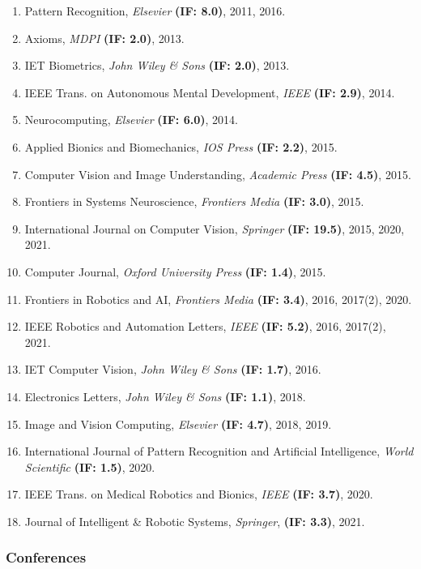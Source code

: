 \documentclass[
]{article}
\begin{document}
\begin{enumerate}
\item
  Pattern Recognition, \emph{Elsevier} \textbf{(IF: 8.0)}, 2011, 2016.
\item
  Axioms, \emph{MDPI} \textbf{(IF: 2.0)}, 2013.
\item
  IET Biometrics, \emph{John Wiley \& Sons} \textbf{(IF: 2.0)}, 2013.
\item
  IEEE Trans. on Autonomous Mental Development, \emph{IEEE} \textbf{(IF:
  2.9)}, 2014.
\item
  Neurocomputing, \emph{Elsevier} \textbf{(IF: 6.0)}, 2014.
\item
  Applied Bionics and Biomechanics, \emph{IOS Press} \textbf{(IF: 2.2)},
  2015.
\item
  Computer Vision and Image Understanding, \emph{Academic Press}
  \textbf{(IF: 4.5)}, 2015.
\item
  Frontiers in Systems Neuroscience, \emph{Frontiers Media} \textbf{(IF:
  3.0)}, 2015.
\item
  International Journal on Computer Vision, \emph{Springer} \textbf{(IF:
  19.5)}, 2015, 2020, 2021.
\item
  Computer Journal, \emph{Oxford University Press} \textbf{(IF: 1.4)},
  2015.
\item
  Frontiers in Robotics and AI, \emph{Frontiers Media} \textbf{(IF:
  3.4)}, 2016, 2017(2), 2020.
\item
  IEEE Robotics and Automation Letters, \emph{IEEE} \textbf{(IF: 5.2)},
  2016, 2017(2), 2021.
\item
  IET Computer Vision, \emph{John Wiley \& Sons} \textbf{(IF: 1.7)},
  2016.
\item
  Electronics Letters, \emph{John Wiley \& Sons} \textbf{(IF: 1.1)},
  2018.
\item
  Image and Vision Computing, \emph{Elsevier} \textbf{(IF: 4.7)}, 2018,
  2019.
\item
  International Journal of Pattern Recognition and Artificial
  Intelligence, \emph{World Scientific} \textbf{(IF: 1.5)}, 2020.
\item
  IEEE Trans. on Medical Robotics and Bionics, \emph{IEEE} \textbf{(IF:
  3.7)}, 2020.
\item
  Journal of Intelligent \& Robotic Systems, \emph{Springer},
  \textbf{(IF: 3.3)}, 2021.
\end{enumerate}

\subsubsection{Conferences}\label{conferences}
\end{document}

